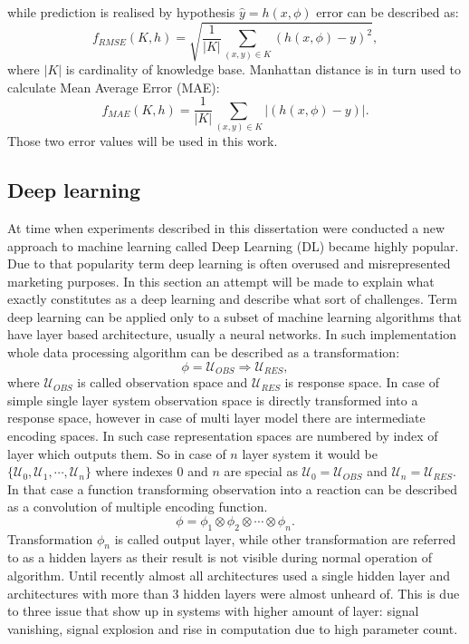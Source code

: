 while prediction is realised by hypothesis $\hat{y} = h(x,\phi)$ error can be described as:
\begin{equation}
	\label{equ:mse}
	f_{RMSE}(K,h) = \sqrt{\frac{1}{\vert K \vert} \sum_{(x,y) \in K}(h(x,\phi)-y)^2},
\end{equation}
where $\vert K \vert$ is cardinality of knowledge base.
Manhattan distance is in turn used to calculate Mean Average Error (MAE):
\begin{equation}
	\label{equ:mae}
	f_{MAE}(K,h) = \frac{1}{\vert K \vert} \sum_{(x,y) \in K}\vert (h(x,\phi)-y)\vert.
\end{equation}
Those two error values will be used in this work.


\subsection{Deep learning}
At time when experiments described in this dissertation were conducted a new approach to 
machine learning called Deep Learning (DL) became highly popular.
Due to that popularity term deep learning is often overused and misrepresented marketing 
purposes. In this section an attempt will be made to explain what exactly constitutes as a
deep learning and describe what sort of challenges.
Term deep learning can be applied only to a subset of machine learning algorithms that have
layer based architecture, usually a neural networks.
In such implementation whole data processing algorithm can be described as a transformation:
\begin{equation}
	\label{equ:spaces1}
	\phi = \mathcal{U}_{OBS} \Rightarrow \mathcal{U}_{RES},
\end{equation}
where $\mathcal{U}_{OBS}$ is called observation space and $\mathcal{U}_{RES}$ is response space.
In case of simple single layer system observation space is directly transformed into a 
response space, however in case of multi layer model there are intermediate encoding spaces.
In such case representation spaces are numbered by index of layer which outputs them. 
So in case of $n$ layer system it would be $\{\mathcal{U}_{0}, \mathcal{U}_{1},
\cdots, \mathcal{U}_{n}\}$ where indexes $0$ and $n$ are special as 
$\mathcal{U}_{0}=\mathcal{U}_{OBS}$ and $\mathcal{U}_{n}=\mathcal{U}_{RES}$.
In that case a function transforming observation into a reaction can be described as a 
convolution of multiple encoding function.
\begin{equation}
	\label{equ:spaces_transform}
	\phi = \phi_{1} \otimes \phi_{2} \otimes \cdots \otimes \phi_{n}.
\end{equation}
Transformation $\phi_{n}$ is called output layer, while other transformation are referred to
as a hidden layers as their result is not visible during normal operation of algorithm.
Until recently almost all architectures used a single hidden layer and architectures with more
than 3 hidden layers were almost unheard of.
This is due to three issue that show up in systems with higher amount of layer: signal vanishing,
signal explosion and rise in computation due to high parameter count.


